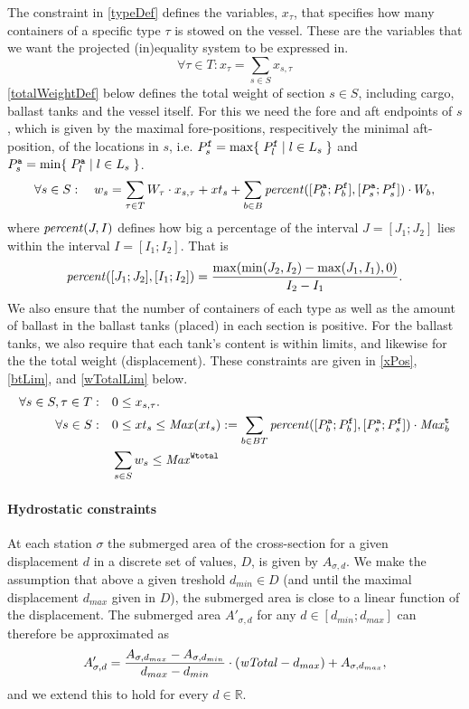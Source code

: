 The constraint in \eqref{typeDef} defines the variables, $x_\tau$, that specifies how many containers of a specific type $\tau$ is stowed on the vessel. These are the variables that we want the projected (in)equality system to be expressed in.
\begin{equation}
\label{typeDef}
	\forall{\tau \in T}: x_\tau = \sum_{s\in S} x_{s,\tau}
\end{equation}
\eqref{totalWeightDef} below defines the total weight of section $s\in S$, including cargo, ballast tanks and the vessel itself. For this we need the fore and aft endpoints of $s$, which is given by the maximal fore-positions, respecitively the minimal aft-position, of the locations in $s$, i.e. $P^{\texttt{f}}_s = \max\{\;{P^{\texttt{f}}_l}\;|\;{l\in L_s}\;\}$ and $P^{\texttt{a}}_s = \min\{\;{P^{\texttt{a}}_l}\;|\;{l\in L_s}\;\}$.  
\begin{equation}
\label{totalWeightDef}
	\forall s \in S:\quad w_s = \sum_{\tau \in T} W_\tau\cdot x_{s,\tau} + xt_s + \sum_{b\in B} \mathit{percent}([P^{\texttt{a}}_b;P^{\texttt{f}}_b],[P^{\texttt{a}}_s;P^{\texttt{f}}_s])\cdot W_b,
\end{equation}
where $\mathit{percent}(J, I)$ defines how big a percentage of the interval $J=[J_1; J_2]$ lies within the interval $I = [I_1; I_2]$. That is 
\[
\mathit{percent}([J_1;J_2], [I_1; I_2]) = \frac{\max(\min(J_2, I_2)-\max(J_1, I_1),0)}{I_2-I_1}.
\]
We also ensure that the number of containers of each type as well as the amount of ballast in the ballast tanks (placed) in each section is positive. 
For the ballast tanks, we also require that each tank's content is within limits, and likewise for the the total weight (displacement). These constraints are given in \eqref{xPos}, \eqref{btLim}, and \eqref{wTotalLim} below.
\begin{align}
	\label{xPos}
	\forall s\in S, \tau\in T:&\quad 0 \leq x_{s,\tau}.\\
	\label{btLim}
	\forall s \in S:	&\quad 0 \leq xt_s \leq \mi{Max}(xt_s) := \sum_{b \in BT} \mi{percent}([P_b^\trt{a};P_b^\trt{f}],[P_s^\trt{a};P_s^\trt{f}])\cdot \mi{Max}^\trt{t}_b\\
%
	\label{wTotalLim}
	&\quad \sum_{s\in S} w_s \leq \mi{Max}^\trt{Wtotal}
\end{align}
\paragraph{Hydrostatic constraints}
At each station $\sigma$ the submerged area of the cross-section for a given displacement $d$ in a discrete set of values, $D$, is given by $A_{\sigma,d}$. 
We make the assumption that above a given treshold $d_{min}\in D$ (and until the maximal displacement $d_{max}$ given in $D$), the submerged area is close to a linear function of the displacement. The submerged area $A'_{\sigma,d}$ for any $d\in [d_{min};d_{max}]$ can therefore be approximated as 
\[
A'_{\sigma,d} = \frac{A_{\sigma,d_{max}} - A_{\sigma,d_{min}}}{d_{max} - d_{min}} \cdot (\mathit{wTotal} - d_{max}) + A_{\sigma,d_{max}},
\]
and we extend this to hold for every $d\in \mathbb{R}$.

